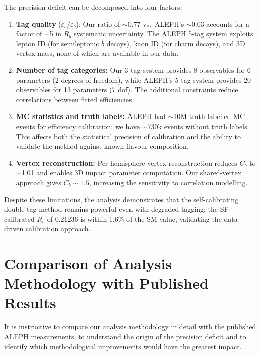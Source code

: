 \documentclass[11pt,a4paper]{article}
\begin{document}
The precision deficit can be decomposed into four factors:
\begin{enumerate}
\item \textbf{Tag quality} ($\varepsilon_c/\varepsilon_b$):
  Our ratio of $\sim$0.77 vs.\ ALEPH's $\sim$0.03 accounts for
  a factor of $\sim$5 in $R_b$ systematic uncertainty.
  The ALEPH 5-tag system exploits lepton ID (for semileptonic
  $b$ decays), kaon ID (for charm decays), and 3D vertex mass,
  none of which are available in our data.

\item \textbf{Number of tag categories:}
  Our 3-tag system provides 8 observables for 6 parameters (2
  degrees of freedom), while ALEPH's 5-tag system provides 20
  observables for 13 parameters (7 dof).
  The additional constraints reduce correlations between
  fitted efficiencies.

\item \textbf{MC statistics and truth labels:}
  ALEPH had $\sim$10M truth-labelled MC events for efficiency
  calibration; we have $\sim$730k events without truth labels.
  This affects both the statistical precision of calibration and
  the ability to validate the method against known flavour
  composition.

\item \textbf{Vertex reconstruction:}
  Per-hemisphere vertex reconstruction reduces $C_b$ to $\sim$1.01
  and enables 3D impact parameter computation.
  Our shared-vertex approach gives $C_b \sim 1.5$, increasing the
  sensitivity to correlation modelling.
\end{enumerate}

Despite these limitations, the analysis demonstrates that the
self-calibrating double-tag method remains powerful even with
degraded tagging: the SF-calibrated $R_b$ of $0.21236$ is within
1.6\% of the SM value, validating the data-driven calibration
approach.

\section{Comparison of Analysis Methodology with Published Results}
\label{sec:method_comparison}

It is instructive to compare our analysis methodology in detail
with the published ALEPH measurements, to understand the origin
of the precision deficit and to identify which methodological
improvements would have the greatest impact.
\end{document}

